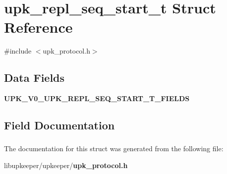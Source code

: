 \section{upk\_\-repl\_\-seq\_\-start\_\-t Struct Reference}
\label{structupk__repl__seq__start__t}


{\ttfamily \#include $<$upk\_\-protocol.h$>$}

\subsection*{Data Fields}
\begin{DoxyCompactItemize}
\item 
{\bf UPK\_\-V0\_\-UPK\_\-REPL\_\-SEQ\_\-START\_\-T\_\-FIELDS}
\end{DoxyCompactItemize}


\subsection{Field Documentation}
\subsubsection[{UPK\_\-V0\_\-UPK\_\-REPL\_\-SEQ\_\-START\_\-T\_\-FIELDS}]{}\label{structupk__repl__seq__start__t_ab32c1fd5691f8e19d59626fca34b01e9}


The documentation for this struct was generated from the following file:\begin{DoxyCompactItemize}
\item 
libupkeeper/upkeeper/{\bf upk\_\-protocol.h}\end{DoxyCompactItemize}

